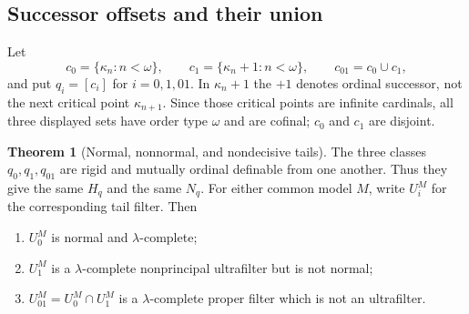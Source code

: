 \documentclass[11pt,letterpaper]{article}
\theoremstyle{definition}
\newtheorem{theorem}[definition]{Theorem}
\numberwithin{equation}{section}
\begin{document}
\subsection{Successor offsets and their union}

Let
\[
 c_0=\{\kappa_n:n<\omega\},\qquad
 c_1=\{\kappa_n+1:n<\omega\},\qquad
 c_{01}=c_0\cup c_1,
\]
and put $q_i=[c_i]$ for $i=0,1,01$. In $\kappa_n+1$ the $+1$ denotes ordinal successor, not the next critical point $\kappa_{n+1}$. Since those critical points are infinite cardinals, all three displayed sets have order type $\omega$ and are cofinal; $c_0$ and $c_1$ are disjoint.

\begin{theorem}[Normal, nonnormal, and nondecisive tails]\label{thm:three}
The three classes $q_0,q_1,q_{01}$ are rigid and mutually ordinal definable from one another. Thus they give the same $H_q$ and the same $N_q$. For either common model $M$, write $U_i^M$ for the corresponding tail filter. Then
\begin{enumerate}
\item $U_0^M$ is normal and $\lambda$-complete;
\item $U_1^M$ is a $\lambda$-complete nonprincipal ultrafilter but is not normal;
\item $U_{01}^M=U_0^M\cap U_1^M$ is a $\lambda$-complete proper filter which is not an ultrafilter.
\end{enumerate}
\end{theorem}
\end{document}
